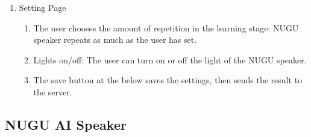\documentclass[conference]{IEEEtran}
\begin{document}
\begin{enumerate}
\begin{enumerate}
            \end{enumerate}
        \item Setting Page
            \begin{enumerate}
                \item The user chooses the amount of repetition in the learning stage: NUGU speaker repeats as much as the user has set.
                \item Lights on/off: The user can turn on or off the light of the NUGU speaker.
                \item The save button at the below saves the settings, then sends the result to the server.
            \end{enumerate}
        
    \end{enumerate}

\subsection{NUGU AI Speaker}
\end{document}
